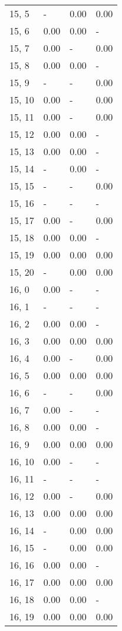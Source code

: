 \begin{table}
\begin{tabular}{llll}
15, 5  &     - &  0.00 &  0.00 \\
15, 6  &  0.00 &  0.00 &     - \\
15, 7  &  0.00 &     - &  0.00 \\
15, 8  &  0.00 &  0.00 &     - \\
15, 9  &     - &     - &  0.00 \\
15, 10 &  0.00 &     - &  0.00 \\
15, 11 &  0.00 &     - &  0.00 \\
15, 12 &  0.00 &  0.00 &     - \\
15, 13 &  0.00 &  0.00 &     - \\
15, 14 &     - &  0.00 &     - \\
15, 15 &     - &     - &  0.00 \\
15, 16 &     - &     - &     - \\
15, 17 &  0.00 &     - &  0.00 \\
15, 18 &  0.00 &  0.00 &     - \\
15, 19 &  0.00 &  0.00 &  0.00 \\
15, 20 &     - &  0.00 &  0.00 \\
16, 0  &  0.00 &     - &     - \\
16, 1  &     - &     - &     - \\
16, 2  &  0.00 &  0.00 &     - \\
16, 3  &  0.00 &  0.00 &  0.00 \\
16, 4  &  0.00 &     - &  0.00 \\
16, 5  &  0.00 &  0.00 &  0.00 \\
16, 6  &     - &     - &  0.00 \\
16, 7  &  0.00 &     - &     - \\
16, 8  &  0.00 &  0.00 &     - \\
16, 9  &  0.00 &  0.00 &  0.00 \\
16, 10 &  0.00 &     - &     - \\
16, 11 &     - &     - &     - \\
16, 12 &  0.00 &     - &  0.00 \\
16, 13 &  0.00 &  0.00 &  0.00 \\
16, 14 &     - &  0.00 &  0.00 \\
16, 15 &     - &  0.00 &  0.00 \\
16, 16 &  0.00 &  0.00 &     - \\
16, 17 &  0.00 &  0.00 &  0.00 \\
16, 18 &  0.00 &  0.00 &     - \\
16, 19 &  0.00 &  0.00 &  0.00 \\

\end{tabular}
\end{table}
